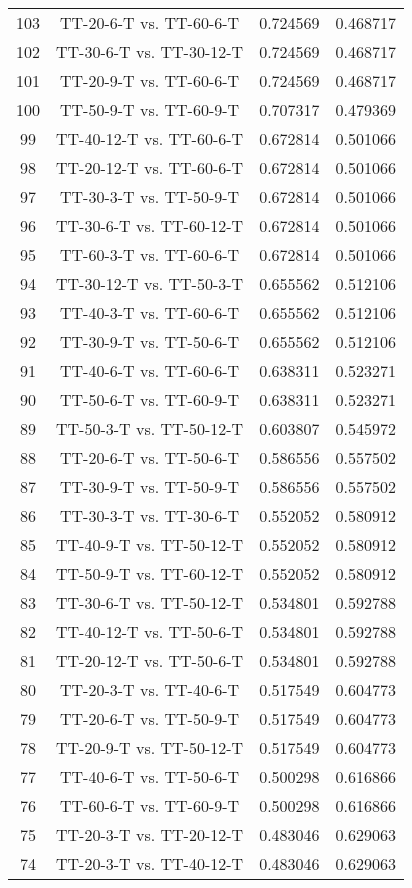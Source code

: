 \documentclass[a4paper,10pt]{article}
\begin{document}
\begin{landscape}
\begin{table}[!htp]
\begin{tabular}{cccc}
103&TT-20-6-T vs. TT-60-6-T&0.724569&0.468717\\
102&TT-30-6-T vs. TT-30-12-T&0.724569&0.468717\\
101&TT-20-9-T vs. TT-60-6-T&0.724569&0.468717\\
100&TT-50-9-T vs. TT-60-9-T&0.707317&0.479369\\
99&TT-40-12-T vs. TT-60-6-T&0.672814&0.501066\\
98&TT-20-12-T vs. TT-60-6-T&0.672814&0.501066\\
97&TT-30-3-T vs. TT-50-9-T&0.672814&0.501066\\
96&TT-30-6-T vs. TT-60-12-T&0.672814&0.501066\\
95&TT-60-3-T vs. TT-60-6-T&0.672814&0.501066\\
94&TT-30-12-T vs. TT-50-3-T&0.655562&0.512106\\
93&TT-40-3-T vs. TT-60-6-T&0.655562&0.512106\\
92&TT-30-9-T vs. TT-50-6-T&0.655562&0.512106\\
91&TT-40-6-T vs. TT-60-6-T&0.638311&0.523271\\
90&TT-50-6-T vs. TT-60-9-T&0.638311&0.523271\\
89&TT-50-3-T vs. TT-50-12-T&0.603807&0.545972\\
88&TT-20-6-T vs. TT-50-6-T&0.586556&0.557502\\
87&TT-30-9-T vs. TT-50-9-T&0.586556&0.557502\\
86&TT-30-3-T vs. TT-30-6-T&0.552052&0.580912\\
85&TT-40-9-T vs. TT-50-12-T&0.552052&0.580912\\
84&TT-50-9-T vs. TT-60-12-T&0.552052&0.580912\\
83&TT-30-6-T vs. TT-50-12-T&0.534801&0.592788\\
82&TT-40-12-T vs. TT-50-6-T&0.534801&0.592788\\
81&TT-20-12-T vs. TT-50-6-T&0.534801&0.592788\\
80&TT-20-3-T vs. TT-40-6-T&0.517549&0.604773\\
79&TT-20-6-T vs. TT-50-9-T&0.517549&0.604773\\
78&TT-20-9-T vs. TT-50-12-T&0.517549&0.604773\\
77&TT-40-6-T vs. TT-50-6-T&0.500298&0.616866\\
76&TT-60-6-T vs. TT-60-9-T&0.500298&0.616866\\
75&TT-20-3-T vs. TT-20-12-T&0.483046&0.629063\\
74&TT-20-3-T vs. TT-40-12-T&0.483046&0.629063\\

\end{tabular}
\end{table}
\end{landscape}
\end{document}
